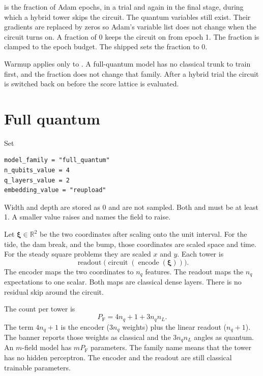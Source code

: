  is the fraction of Adam epochs, in a trial and again in the final stage, during which a hybrid tower skips the circuit.
The quantum variables still exist.
Their gradients are replaced by zeros so Adam's variable list does not change when the circuit turns on.
A fraction of 0 keeps the circuit on from epoch 1.
The fraction is clamped to the epoch budget.
The shipped  sets the fraction to 0.

Warmup applies only to .
A full-quantum model has no classical trunk to train first, and the fraction does not change that family.
After a hybrid trial the circuit is switched back on before the score lattice is evaluated.

\section{Full quantum}
\label{sec:full}

Set
\begin{lstlisting}
model_family = "full_quantum"
n_qubits_value = 4
q_layers_value = 2
embedding_value = "reupload"
\end{lstlisting}
Width and depth are stored as 0 and are not sampled.
Both  and  must be at least 1.
A smaller value raises  and names the field to raise.

Let \(\boldsymbol{\xi}\in\mathbb{R}^{2}\) be the two coordinates after scaling onto the unit interval.
For the tide, the dam break, and the bump, those coordinates are scaled space and time.
For the steady square problems they are scaled \(x\) and \(y\).
Each tower is
\begin{equation}
\label{eq:full}
\operatorname{readout}\!\big(
\operatorname{circuit}(\operatorname{encode}(\boldsymbol{\xi}))
\big).
\end{equation}
The encoder maps the two coordinates to \(n_{q}\) features.
The readout maps the \(n_{q}\) expectations to one scalar.
Both maps are classical dense layers.
There is no residual skip around the circuit.

The count per tower is
\begin{equation}
\label{eq:full-count}
P_{\mathrm{F}}
= 4n_{q} + 1 + 3n_{q}n_{L}.
\end{equation}
The term \(4n_{q}+1\) is the encoder (\(3n_{q}\) weights) plus the linear readout (\(n_{q}+1\)).
The banner reports those weights as classical and the \(3n_{q}n_{L}\) angles as quantum.
An \(m\)-field model has \(m P_{\mathrm{F}}\) parameters.
The family name means that the tower has no hidden perceptron.
The encoder and the readout are still classical trainable parameters.

